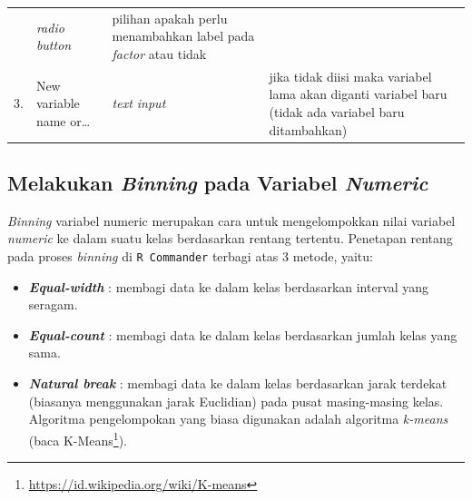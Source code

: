 \documentclass[12pt,]{krantz}
\providecommand{\tightlist}{%
  \setlength{\itemsep}{0pt}\setlength{\parskip}{0pt}}
\let\rmarkdownfootnote\footnote%
\def\footnote{\protect\rmarkdownfootnote}
\renewcommand{\href}[2]{#2\footnote{\url{#1}}}
\begin{document}
\begin{longtable}[]{@{}llll@{}}
\begin{minipage}[t]{0.14\columnwidth}
\end{minipage} & \begin{minipage}[t]{0.09\columnwidth}\raggedright
\emph{radio button}\strut
\end{minipage} & \begin{minipage}[t]{0.61\columnwidth}\raggedright
pilihan apakah perlu menambahkan label pada \emph{factor} atau tidak\strut
\end{minipage}\tabularnewline
\begin{minipage}[t]{0.04\columnwidth}\raggedright
3.\strut
\end{minipage} & \begin{minipage}[t]{0.14\columnwidth}\raggedright
New variable name or\ldots{}\strut
\end{minipage} & \begin{minipage}[t]{0.09\columnwidth}\raggedright
\emph{text input}\strut
\end{minipage} & \begin{minipage}[t]{0.61\columnwidth}\raggedright
jika tidak diisi maka variabel lama akan diganti variabel baru (tidak ada variabel baru ditambahkan)\strut
\end{minipage}\tabularnewline
\bottomrule
\end{longtable}

\hypertarget{melakukan-binning-pada-variabel-numeric}{%
\subsection{\texorpdfstring{Melakukan \emph{Binning} pada Variabel \emph{Numeric}}{Melakukan Binning pada Variabel Numeric}}\label{melakukan-binning-pada-variabel-numeric}}

\emph{Binning} variabel numeric merupakan cara untuk mengelompokkan nilai variabel \emph{numeric} ke dalam suatu kelas berdasarkan rentang tertentu. Penetapan rentang pada proses \emph{binning} di \texttt{R\ Commander} terbagi atas 3 metode, yaitu:

\begin{itemize}
\tightlist
\item
  \textbf{\emph{Equal-width}} : membagi data ke dalam kelas berdasarkan interval yang seragam.
\item
  \textbf{\emph{Equal-count}} : membagi data ke dalam kelas berdasarkan jumlah kelas yang sama.
\item
  \textbf{\emph{Natural break}} : membagi data ke dalam kelas berdasarkan jarak terdekat (biasanya menggunakan jarak Euclidian) pada pusat masing-masing kelas. Algoritma pengelompokan yang biasa digunakan adalah algoritma \emph{k-means} (baca \href{https://id.wikipedia.org/wiki/K-means}{K-Means}).
\end{itemize}
\end{document}
